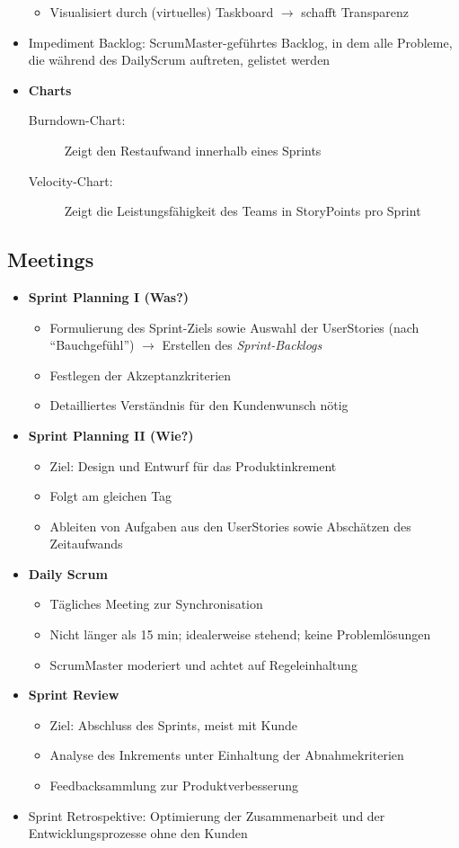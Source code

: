 \begin{itemize}
\begin{itemize}
		\item Visualisiert durch (virtuelles) Taskboard \(\rightarrow\) schafft Transparenz
	\end{itemize}
	\item Impediment Backlog: ScrumMaster-geführtes Backlog, in dem alle Probleme, die während des DailyScrum auftreten, gelistet werden
	\item \textbf{Charts}
	\begin{description}
		\item[Burndown-Chart:] Zeigt den Restaufwand innerhalb eines Sprints
		\item[Velocity-Chart:] Zeigt die Leistungsfähigkeit des Teams in StoryPoints pro Sprint
	\end{description}
\end{itemize}


\subsection{Meetings}
\begin{itemize}
	\item \textbf{Sprint Planning I (Was?)}
	\begin{itemize}
		\item Formulierung des Sprint-Ziels sowie Auswahl der UserStories (nach "`Bauchgefühl"') \(\rightarrow\) Erstellen des \textit{Sprint-Backlogs}
		\item Festlegen der Akzeptanzkriterien
		\item Detailliertes Verständnis für den Kundenwunsch nötig
	\end{itemize}
	\item \textbf{Sprint Planning II (Wie?)}
	\begin{itemize}
		\item Ziel: Design und Entwurf für das Produktinkrement
		\item Folgt am gleichen Tag
		\item Ableiten von Aufgaben aus den UserStories sowie Abschätzen des Zeitaufwands
	\end{itemize}
	\item \textbf{Daily Scrum}
	\begin{itemize}
		\item Tägliches Meeting zur Synchronisation
		\item Nicht länger als 15 min; idealerweise stehend; keine Problemlösungen
		\item ScrumMaster moderiert und achtet auf Regeleinhaltung
	\end{itemize}
	\item \textbf{Sprint Review}
	\begin{itemize}
		\item Ziel: Abschluss des Sprints, meist mit Kunde
		\item Analyse des Inkrements unter Einhaltung der Abnahmekriterien
		\item Feedbacksammlung zur Produktverbesserung
	\end{itemize}
	\item Sprint Retrospektive: Optimierung der Zusammenarbeit und der Entwicklungsprozesse ohne den Kunden
\end{itemize}


